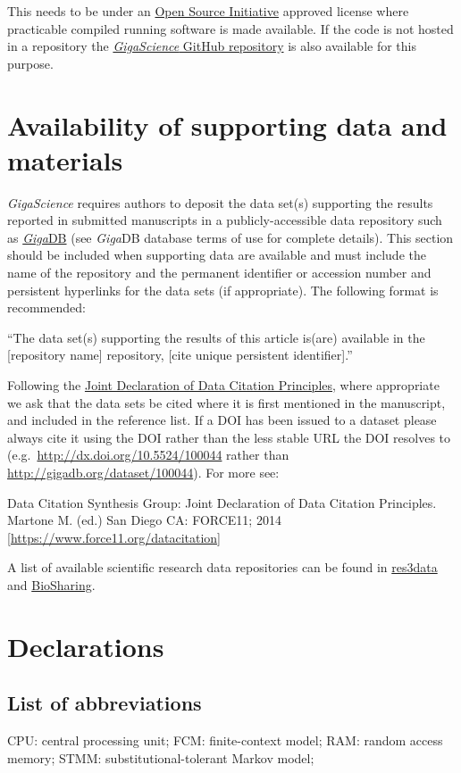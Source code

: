\documentclass[a4paper,num-refs]{oup-contemporary}
\begin{document}
This needs to be under an \href{http:/opensource.org/licenses}{Open Source Initiative} approved license where practicable compiled running software is made available. If the code is not hosted in a repository the \href{https://github.com/gigascience}{\textit{GigaScience} GitHub repository} is also available for this purpose.

\section{Availability of supporting data and materials}

\textit{GigaScience} requires authors to deposit the data set(s) supporting the results reported in submitted manuscripts in a publicly-accessible data repository such as \href{http://gigadb.org/}{\textit{Giga}DB} (see \textit{Giga}DB database terms of use for complete details). This section should be included when supporting data are available and must include the name of the repository and the permanent identifier or accession number and persistent hyperlinks for the data sets (if appropriate). The following format is recommended:

``The data set(s) supporting the results of this article is(are) available in the [repository name] repository, [cite unique persistent identifier].''

Following the \href{https://www.force11.org/group/joint-declaration-data-citation-principles-final}{Joint Declaration of Data Citation Principles}, where appropriate we ask that the data sets be cited where it is first mentioned in the manuscript, and included in the reference list. If a DOI has been issued to a dataset please always cite it using the DOI rather than the less stable URL the DOI resolves to (e.g.~\url{http://dx.doi.org/10.5524/100044} rather than \url{http://gigadb.org/dataset/100044}). For more see:

Data Citation Synthesis Group: Joint Declaration of Data Citation Principles. Martone M. (ed.) San Diego CA: FORCE11; 2014 [\url{https://www.force11.org/datacitation}]

A list of available scientific research data repositories can be found in \href{http://www.re3data.org/}{res3data} and \href{https://biosharing.org/}{BioSharing}.

\section{Declarations}

\subsection{List of abbreviations}
CPU: central processing unit; FCM: finite-context model; RAM: random access memory; STMM: substitutional-tolerant Markov model;
\end{document}
